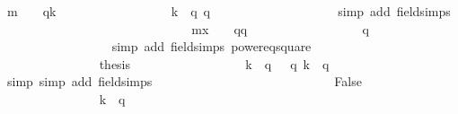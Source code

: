 \begin{isabellebody}
\ {\isachardoublequoteopen}m{\isacharprime}\ {\isacharequal}\ {}\ {\isacharminus}\ {}{\isacharslash}{\isacharparenleft}q{\isacharasterisk}k{\isacharparenright}{\isachardoublequoteclose}\isanewline
\ \ \ \ \ \ \ \ \ \ \ \ \ \ \ \ \isamarkupfalse%
\ {\isacharbackquoteopen}k\ {\isasymin}\ {\isacharbraceleft}{}{\isachardot}{\isachardot}{\isacharless}q{\isacharplus}{}{\isacharplus}{}{\isacharbraceright}{\isacharbackquoteclose}\ {\isacharbackquoteopen}q\ {\isasymge}\ {}{\isacharbackquoteclose}\isanewline
\ \ \ \ \ \ \ \ \ \ \ \ \ \ \ \ \isamarkupfalse%
\ {\isacharparenleft}simp\ add{\isacharcolon}\ field{\isacharunderscore}simps{\isacharparenright}\isanewline
\ \ \ \ \ \ \ \ \ \ \ \ \ \ \isamarkupfalse%
\isanewline
\ \ \ \ \ \ \ \ \ \ \ \ \ \ \isamarkupfalse%
\ {\isachardoublequoteopen}{\isacharquery}mx\ {\isacharequal}\ {}\ {\isacharminus}\ {}{\isacharslash}{\isacharparenleft}q{\isacharasterisk}q{\isacharparenright}{\isachardoublequoteclose}\isanewline
\ \ \ \ \ \ \ \ \ \ \ \ \ \ \ \ \isamarkupfalse%
\ {\isacharbackquoteopen}q\ {\isasymge}\ {}{\isacharbackquoteclose}\isanewline
\ \ \ \ \ \ \ \ \ \ \ \ \ \ \ \ \isamarkupfalse%
\ {\isacharparenleft}simp\ add{\isacharcolon}\ field{\isacharunderscore}simps\ power{}{\isacharunderscore}eq{\isacharunderscore}square{\isacharparenright}\isanewline
\ \ \ \ \ \ \ \ \ \ \ \ \ \ \isamarkupfalse%
\isanewline
\ \ \ \ \ \ \ \ \ \ \ \ \ \ \isamarkupfalse%
\ {\isacharquery}thesis\isanewline
\ \ \ \ \ \ \ \ \ \ \ \ \ \ \ \ \isamarkupfalse%
\ {\isacharbackquoteopen}k\ {\isasymle}\ q{\isacharbackquoteclose}\ {\isacharbackquoteopen}{}\ {\isasymle}\ q{\isacharbackquoteclose}\ {\isacharbackquoteopen}k\ {\isasymin}\ {\isacharbraceleft}{}{\isachardot}{\isachardot}{\isacharless}q{\isacharplus}{}{\isacharplus}{}{\isacharbraceright}{\isacharbackquoteclose}\isanewline
\ \ \ \ \ \ \ \ \ \ \ \ \ \ \ \ \isamarkupfalse%
\ simp\ {\isacharparenleft}simp\ add{\isacharcolon}\ field{\isacharunderscore}simps{\isacharparenright}\isanewline
\ \ \ \ \ \ \ \ \ \ \ \ \isamarkupfalse%
\isanewline
\ \ \ \ \ \ \ \ \ \ \ \ \ \ \isamarkupfalse%
\ False\isanewline
\ \ \ \ \ \ \ \ \ \ \ \ \ \ \isamarkupfalse%
\ {\isachardoublequoteopen}k\ {\isacharequal}\ q{\isacharplus}{}{\isachardoublequoteclose}\isanewline

\end{isabellebody}
